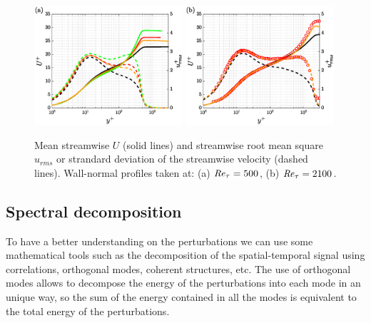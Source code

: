 \begin{figure}
    \centering
    \includegraphics[width=0.49\textwidth]{imgs/stats/U_uu_a.eps}
    \includegraphics[width=0.49\textwidth]{imgs/stats/U_uu_b.eps}
    \caption{Mean streamwise $U$ (solid lines) and streamwise root mean square $u_{rms}$ or strandard deviation of the streamwise velocity (dashed lines). Wall-normal profiles taken at: (a) $\mbox{\textit{Re}}_{\tau}=500$, (b) $\mbox{\textit{Re}}_{\tau}=2100$. }
    \label{fig:U_uu_cap2}
\end{figure}

\subsection{Spectral decomposition}
To have a better understanding on the perturbations we can use some mathematical tools such as the decomposition of the spatial-temporal signal using correlations, orthogonal modes, coherent structures, etc.
The use of orthogonal modes allows to decompose the energy of the perturbations into each mode in an unique way, so the sum of the energy contained in all the modes is equivalent to the total energy of the perturbations. 

